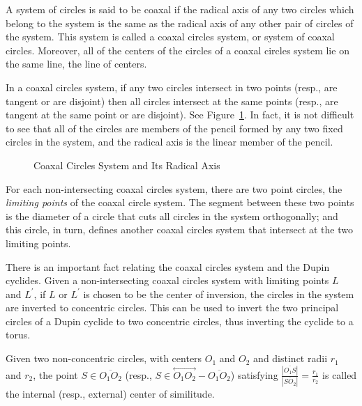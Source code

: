 \begin{definition}
     A system of circles is said to be coaxal if the radical axis of any two 
circles which belong to the system is the same as the radical axis of any 
other pair of circles of the system.  This system is called a coaxal circles
system, or system of coaxal circles.  Moreover, all of the centers of the
circles of a coaxal circles system lie on the same line, the line of centers.
\end{definition}

     In a coaxal circles system, if any two circles intersect in two points 
(resp., are tangent or are disjoint) then all circles intersect at the same 
points (resp., are tangent at the same point or are disjoint).  
See Figure~\ref{fig:radical-axis}.  In fact, it is not difficult to see that 
all of the circles are members of the pencil formed by any two fixed circles
in the system, and the radical axis is the linear member of the pencil.
\begin{figure}
\vspace{9.5cm}
\caption{Coaxal Circles System and Its Radical Axis}
\label{fig:radical-axis}
\end{figure}

     For each non-intersecting coaxal circles system, there are two point 
circles, the {\em limiting points} of the coaxal 
circle system.  The segment between these two points is the diameter of a 
circle that cuts all circles in the system orthogonally; and this circle, 
in turn, defines another coaxal circles system that intersect at the two 
limiting points.

     There is an important fact relating the coaxal circles system and the
Dupin cyclides.  Given a non-intersecting coaxal circles system with limiting 
points $L$ and $L^\prime$, if $L$ or $L^\prime$ is chosen to be the center of 
inversion, the circles in the system are inverted to concentric circles.  
This can be used to invert the two principal circles of a Dupin cyclide to 
two concentric circles, thus inverting the cyclide to a torus.

\begin{definition}
     Given two non-concentric circles, with centers $O_1$ and $O_2$ and 
distinct radii $r_1$ and $r_2$, the point $S\in\overline{O_1O_2}$
(resp., $S\in\stackrel{\longleftrightarrow}{O_1O_2}-\overline{O_1O_2}$) 
satisfying 
$\frac{|\overline{O_1S}|}{|\overline{SO_2}|}=\frac{r_1}{r_2}$ is called the
internal (resp., external) center of similitude.  
\end{definition}

